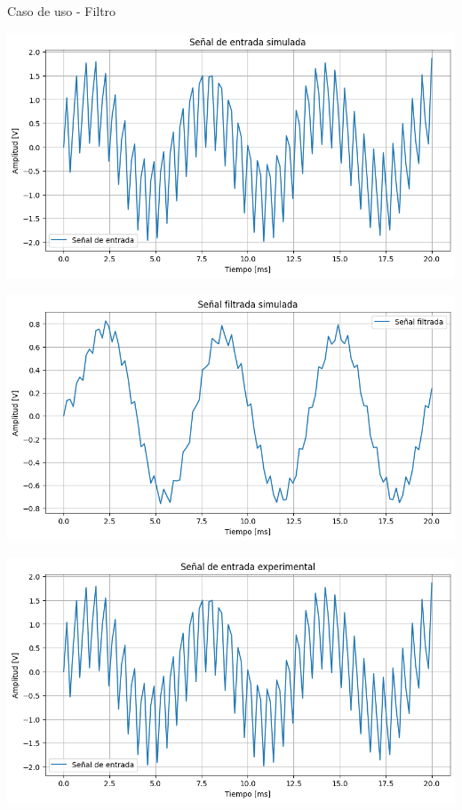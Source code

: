 \documentclass[10pt,aspectratio=169]{beamer} %
\begin{document}
\begin{frame}{Caso de uso - Filtro}
  \centering
  \begin{minipage}{0.45\linewidth}
    \centering
    \includegraphics[scale=0.15]{Filtro/raw_sim.png}
  \end{minipage}%
  \hfill
  \begin{minipage}{0.55\linewidth}
    \centering
    \includegraphics[scale=0.15]{Filtro/filt_sim.png}
  \end{minipage}
  \begin{minipage}{0.45\linewidth}
    \centering
    \includegraphics[scale=0.15]{Filtro/raw_exp.png}

\end{minipage}
\end{frame}
\end{document}
